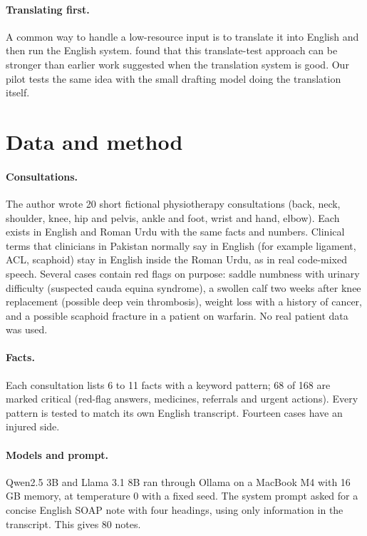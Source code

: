 \documentclass[11pt]{article}
\begin{document}
\paragraph{Translating first.} A common way to handle a low-resource input is to translate it into English and then run the English system. \citet{artetxe2023revisiting} found that this translate-test approach can be stronger than earlier work suggested when the translation system is good. Our pilot tests the same idea with the small drafting model doing the translation itself.

\section{Data and method}
\paragraph{Consultations.} The author wrote 20 short fictional physiotherapy consultations (back, neck, shoulder, knee, hip and pelvis, ankle and foot, wrist and hand, elbow). Each exists in English and Roman Urdu with the same facts and numbers. Clinical terms that clinicians in Pakistan normally say in English (for example ligament, ACL, scaphoid) stay in English inside the Roman Urdu, as in real code-mixed speech. Several cases contain red flags on purpose: saddle numbness with urinary difficulty (suspected cauda equina syndrome), a swollen calf two weeks after knee replacement (possible deep vein thrombosis), weight loss with a history of cancer, and a possible scaphoid fracture in a patient on warfarin. No real patient data was used.

\paragraph{Facts.} Each consultation lists 6 to 11 facts with a keyword pattern; 68 of 168 are marked critical (red-flag answers, medicines, referrals and urgent actions). Every pattern is tested to match its own English transcript. Fourteen cases have an injured side.

\paragraph{Models and prompt.} Qwen2.5 3B \citep{qwen2025qwen25} and Llama 3.1 8B \citep{grattafiori2024llama3} ran through Ollama on a MacBook M4 with 16\,GB memory, at temperature 0 with a fixed seed. The system prompt asked for a concise English SOAP note with four headings, using only information in the transcript. This gives 80 notes.
\end{document}
